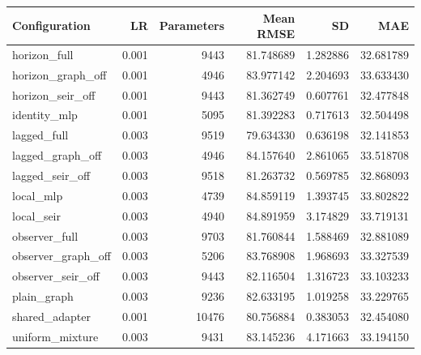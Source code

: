 \begin{longtable}{lrrrrr}\toprule Configuration & LR & Parameters & Mean RMSE & SD & MAE\\\midrule
horizon\_full & 0.001 & 9443 & 81.748689 & 1.282886 & 32.681789\\
horizon\_graph\_off & 0.001 & 4946 & 83.977142 & 2.204693 & 33.633430\\
horizon\_seir\_off & 0.001 & 9443 & 81.362749 & 0.607761 & 32.477848\\
identity\_mlp & 0.001 & 5095 & 81.392283 & 0.717613 & 32.504498\\
lagged\_full & 0.003 & 9519 & 79.634330 & 0.636198 & 32.141853\\
lagged\_graph\_off & 0.003 & 4946 & 84.157640 & 2.861065 & 33.518708\\
lagged\_seir\_off & 0.003 & 9518 & 81.263732 & 0.569785 & 32.868093\\
local\_mlp & 0.003 & 4739 & 84.859119 & 1.393745 & 33.802822\\
local\_seir & 0.003 & 4940 & 84.891959 & 3.174829 & 33.719131\\
observer\_full & 0.003 & 9703 & 81.760844 & 1.588469 & 32.881089\\
observer\_graph\_off & 0.003 & 5206 & 83.768908 & 1.968693 & 33.327539\\
observer\_seir\_off & 0.003 & 9443 & 82.116504 & 1.316723 & 33.103233\\
plain\_graph & 0.003 & 9236 & 82.633195 & 1.019258 & 33.229765\\
shared\_adapter & 0.001 & 10476 & 80.756884 & 0.383053 & 32.454080\\
uniform\_mixture & 0.003 & 9431 & 83.145236 & 4.171663 & 33.194150\\
\bottomrule\end{longtable}